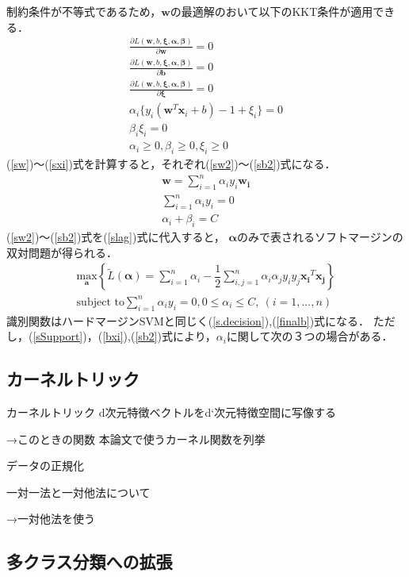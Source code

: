 制約条件が不等式であるため，$\boldsymbol{w}$の最適解のおいて以下のKKT条件が適用できる．
\begin{subequations}
\begin{align}
   \frac{\partial L(\boldsymbol{w},b,\boldsymbol{\xi},\boldsymbol{\alpha},\boldsymbol{\beta})}{\partial \boldsymbol{w}} = 0\label{sw}\\
    \frac{\partial L(\boldsymbol{w},b,\boldsymbol{\xi},\boldsymbol{\alpha},\boldsymbol{\beta})}{\partial \boldsymbol{b}} = 0\label{sb}\\
    \frac{\partial L(\boldsymbol{w},b,\boldsymbol{\xi},\boldsymbol{\alpha},\boldsymbol{\beta})}{\partial \boldsymbol{\xi}} = 0\label{sxi}\\
    \alpha_i \{y_i(\boldsymbol{w}^T \boldsymbol{x}_i + b)-1+\xi_i\}=0\label{sSupport}\\
    \beta_i\xi_i = 0\label{bxi}\\
    \alpha_i \geq 0 ,\beta_i \geq 0,\xi_i \geq 0 
\end{align}
\end{subequations}
 (\ref{sw})〜(\ref{sxi})式を計算すると，それぞれ(\ref{sw2})〜(\ref{sb2})式になる．
 \begin{subequations}
 \begin{align}
   \boldsymbol{w} = \sum_{i=1}^{n}\alpha_i y_i \boldsymbol{w_i} \label{sw2}\\
   \sum_{i=1}^{n}\alpha_i y_i = 0 \\
   \alpha_i + \beta_i = C\label{sb2}
 \end{align}
\end{subequations}
(\ref{sw2})〜(\ref{sb2})式を(\ref{slag})式に代入すると，
$\boldsymbol{\alpha}$のみで表されるソフトマージンの双対問題が得られる．
\begin{align}
    \underset{\boldsymbol{a}}{\text{max}} \left\{\tilde{L}(\boldsymbol{\alpha}) 
    = \sum_{i=1}^{n}\alpha_i - \dfrac{1}{2}\sum_{i,j=1}^{n}
    \alpha_i\alpha_j y_i y_j \boldsymbol{x_i}^T \boldsymbol{x_j}\right\} \nonumber \\
    \text{subject to} \sum_{i=1}^{n}\alpha_i y_i = 0,0 \leq \alpha_i \leq C,\ (i=1,...,n)
\end{align}
識別関数はハードマージンSVMと同じく(\ref{s.decision}),(\ref{finalb})式になる．
ただし，(\ref{sSupport})，(\ref{bxi}),(\ref{sb2})式により，$\alpha_i$に関して次の３つの場合がある．


\subsection{カーネルトリック}
カーネルトリック
d次元特徴ベクトルをd`次元特徴空間に写像する

→このときの関数
本論文で使うカーネル関数を列挙

データの正規化

一対一法と一対他法について

→一対他法を使う
\subsection{多クラス分類への拡張}


